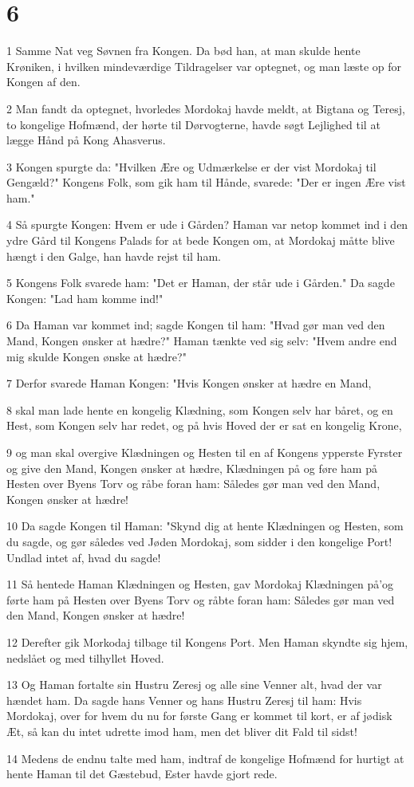 \chapter{6}

\par 1 Samme Nat veg Søvnen fra Kongen. Da bød han, at man skulde hente Krøniken, i hvilken mindeværdige Tildragelser var optegnet, og man læste op for Kongen af den.
\par 2 Man fandt da optegnet, hvorledes Mordokaj havde meldt, at Bigtana og Teresj, to kongelige Hofmænd, der hørte til Dørvogterne, havde søgt Lejlighed til at lægge Hånd på Kong Ahasverus.
\par 3 Kongen spurgte da: "Hvilken Ære og Udmærkelse er der vist Mordokaj til Gengæld?" Kongens Folk, som gik ham til Hånde, svarede: "Der er ingen Ære vist ham."
\par 4 Så spurgte Kongen: Hvem er ude i Gården? Haman var netop kommet ind i den ydre Gård til Kongens Palads for at bede Kongen om, at Mordokaj måtte blive hængt i den Galge, han havde rejst til ham.
\par 5 Kongens Folk svarede ham: "Det er Haman, der står ude i Gården." Da sagde Kongen: "Lad ham komme ind!"
\par 6 Da Haman var kommet ind; sagde Kongen til ham: "Hvad gør man ved den Mand, Kongen ønsker at hædre?" Haman tænkte ved sig selv: "Hvem andre end mig skulde Kongen ønske at hædre?"
\par 7 Derfor svarede Haman Kongen: "Hvis Kongen ønsker at hædre en Mand,
\par 8 skal man lade hente en kongelig Klædning, som Kongen selv har båret, og en Hest, som Kongen selv har redet, og på hvis Hoved der er sat en kongelig Krone,
\par 9 og man skal overgive Klædningen og Hesten til en af Kongens ypperste Fyrster og give den Mand, Kongen ønsker at hædre, Klædningen på og føre ham på Hesten over Byens Torv og råbe foran ham: Således gør man ved den Mand, Kongen ønsker at hædre!
\par 10 Da sagde Kongen til Haman: "Skynd dig at hente Klædningen og Hesten, som du sagde, og gør således ved Jøden Mordokaj, som sidder i den kongelige Port! Undlad intet af, hvad du sagde!
\par 11 Så hentede Haman Klædningen og Hesten, gav Mordokaj Klædningen på'og førte ham på Hesten over Byens Torv og råbte foran ham: Således gør man ved den Mand, Kongen ønsker at hædre!
\par 12 Derefter gik Morkodaj tilbage til Kongens Port. Men Haman skyndte sig hjem, nedslået og med tilhyllet Hoved.
\par 13 Og Haman fortalte sin Hustru Zeresj og alle sine Venner alt, hvad der var hændet ham. Da sagde hans Venner og hans Hustru Zeresj til ham: Hvis Mordokaj, over for hvem du nu for første Gang er kommet til kort, er af jødisk Æt, så kan du intet udrette imod ham, men det bliver dit Fald til sidst!
\par 14 Medens de endnu talte med ham, indtraf de kongelige Hofmænd for hurtigt at hente Haman til det Gæstebud, Ester havde gjort rede.

